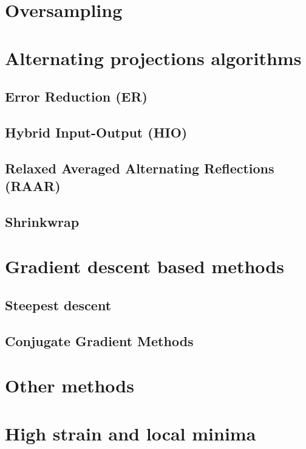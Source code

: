 \section{Oversampling}
\section{Alternating projections algorithms}
\subsection{Error Reduction (ER)}
\subsection{Hybrid Input-Output (HIO)}
\subsection{Relaxed Averaged Alternating Reflections (RAAR)}
\subsection{Shrinkwrap}

\section{Gradient descent based methods}
\subsection{Steepest descent}
\subsection{Conjugate Gradient Methods}

\section{Other methods}
\section{High strain and local minima}